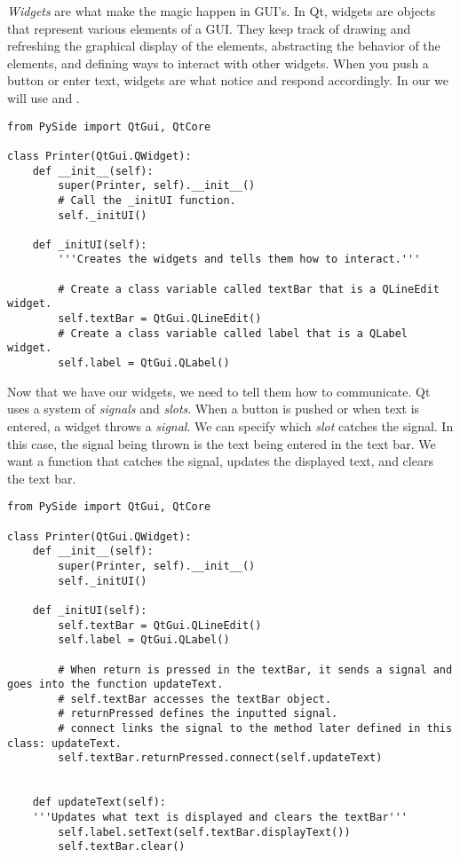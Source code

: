 \emph{Widgets} are what make the magic happen in GUI's.
In Qt, widgets are objects that represent various elements of a GUI.
They keep track of drawing and refreshing the graphical display of the elements, abstracting the behavior of the elements, and defining ways to interact with other widgets.
When you push a button or enter text, widgets are what notice and respond accordingly.
In our  we will use  and .

\begin{lstlisting}
from PySide import QtGui, QtCore

class Printer(QtGui.QWidget):
	def __init__(self):
		super(Printer, self).__init__()
		# Call the _initUI function.
		self._initUI()
	
	def _initUI(self):
		'''Creates the widgets and tells them how to interact.'''
		
		# Create a class variable called textBar that is a QLineEdit widget.
		self.textBar = QtGui.QLineEdit()
		# Create a class variable called label that is a QLabel widget.
		self.label = QtGui.QLabel()

\end{lstlisting}

Now that we have our widgets, we need to tell them how to communicate.
Qt uses a system of \emph{signals} and \emph{slots}.
When a button is pushed or when text is entered, a widget throws a \emph{signal}.
We can specify which \emph{slot} catches the signal.
In this case, the signal being thrown is the text being entered in the text bar. We want a function that catches the signal, updates the displayed text, and clears the text bar.

\begin{lstlisting}
from PySide import QtGui, QtCore

class Printer(QtGui.QWidget):
	def __init__(self):
		super(Printer, self).__init__()
		self._initUI()

	def _initUI(self):
		self.textBar = QtGui.QLineEdit()
		self.label = QtGui.QLabel()
		
		# When return is pressed in the textBar, it sends a signal and goes into the function updateText.
        # self.textBar accesses the textBar object.
        # returnPressed defines the inputted signal.
        # connect links the signal to the method later defined in this class: updateText.
		self.textBar.returnPressed.connect(self.updateText)
	
		
	def updateText(self):
	'''Updates what text is displayed and clears the textBar'''
		self.label.setText(self.textBar.displayText())
		self.textBar.clear()

\end{lstlisting}

